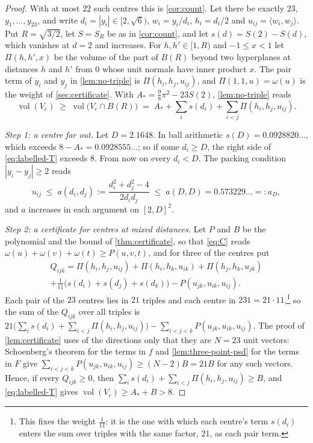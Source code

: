 \documentclass[11pt,reqno]{amsart}
\renewcommand{\_}{\origunderscore\allowbreak}
\numberwithin{equation}{section}
\theoremstyle{plain}
\theoremstyle{definition}
\theoremstyle{remark}
\DeclareMathOperator{\vol}{vol}
\begin{document}
\begin{proof}
With at most $22$ such centres this is \cref{cor:count}. Let there be
exactly $23$, $y_1,\dots,y_{23}$, and write $d_i=|y_i|\in[2,\sqrt6)$,
$w_i=y_i/d_i$, $h_i=d_i/2$ and $u_{ij}=\langle w_i,w_j\rangle$. Put
$R=\sqrt{3/2}$, let $S=S_R$ be as in \cref{cor:count}, and let
$s(d)=S(2)-S(d)$, which vanishes at $d=2$ and increases. For
$h,h'\in[1,R)$ and $-1\le x<1$ let $\Pi(h,h',x)$ be the volume of the
part of $B(R)$ beyond two hyperplanes at distances $h$ and $h'$ from $0$
whose unit normals have inner product $x$. The pair term of $y_i$ and
$y_j$ in \cref{lem:no-triple} is $\Pi(h_i,h_j,u_{ij})$, and
$\Pi(1,1,u)=\omega(u)$ is the weight of \cref{sec:certificate}. With
$A_*=\tfrac98\pi^2-23S(2)$, \cref{lem:no-triple} reads
\begin{equation}\label{eq:labelled-T}
  \vol(V_c)\;\ge\;\vol\bigl(V_c\cap B(R)\bigr)
  \;=\;A_*+\sum_is(d_i)+\sum_{i<j}\Pi(h_i,h_j,u_{ij}).
\end{equation}

\emph{Step 1: a centre far out.} Let $D=2.1648$. In ball arithmetic
$s(D)=0.0928820\ldots$, which exceeds $8-A_*=0.0928555\ldots$; so if some
$d_i\ge D$, the right side of \eqref{eq:labelled-T} exceeds $8$. From
now on every $d_i<D$. The packing condition $|y_i-y_j|\ge2$ reads
\begin{equation}\label{eq:amax}
  u_{ij}\;\le\;a(d_i,d_j):=\frac{d_i^2+d_j^2-4}{2d_id_j}
  \;\le\;a(D,D)=0.573229\ldots=:a_D ,
\end{equation}
and $a$ increases in each argument on $[2,D]^2$.

\emph{Step 2: a certificate for centres at mixed distances.} Let $P$ and
$B$ be the polynomial and the bound of \cref{thm:certificate}, so that
\eqref{eq:C} reads $\omega(u)+\omega(v)+\omega(t)\ge P(u,v,t)$, and for
three of the centres put
\begin{multline*}
  Q_{ijk}=\Pi(h_i,h_j,u_{ij})+\Pi(h_i,h_k,u_{ik})+\Pi(h_j,h_k,u_{jk})\\
  +\tfrac1{11}\bigl(s(d_i)+s(d_j)+s(d_k)\bigr)-P(u_{jk},u_{ik},u_{ij}).
\end{multline*}
Each pair of the $23$ centres lies in $21$ triples and each centre in
$231=21\cdot11$,\footnote{This fixes the weight $\frac1{11}$: it is the
one with which each centre's term $s(d_i)$ enters the sum over triples
with the same factor, $21$, as each pair term.} so the sum of the
$Q_{ijk}$ over all triples is
$21\bigl(\sum_is(d_i)+\sum_{i<j}\Pi(h_i,h_j,u_{ij})\bigr)-\sum_{i<j<k}P(u_{jk},u_{ik},u_{ij})$.
The proof of \cref{lem:certificate} uses of the directions only that
they are $N=23$ unit vectors: Schoenberg's theorem for the terms in $f$
and \cref{lem:three-point-psd} for the terms in $F$ give
$\sum_{i<j<k}P(u_{jk},u_{ik},u_{ij})\ge(N-2)B=21B$ for any such vectors.
Hence, if every $Q_{ijk}\ge0$, then
$\sum_is(d_i)+\sum_{i<j}\Pi(h_i,h_j,u_{ij})\ge B$, and
\eqref{eq:labelled-T} gives $\vol(V_c)\ge A_*+B>8$.


\end{proof}
\end{document}
